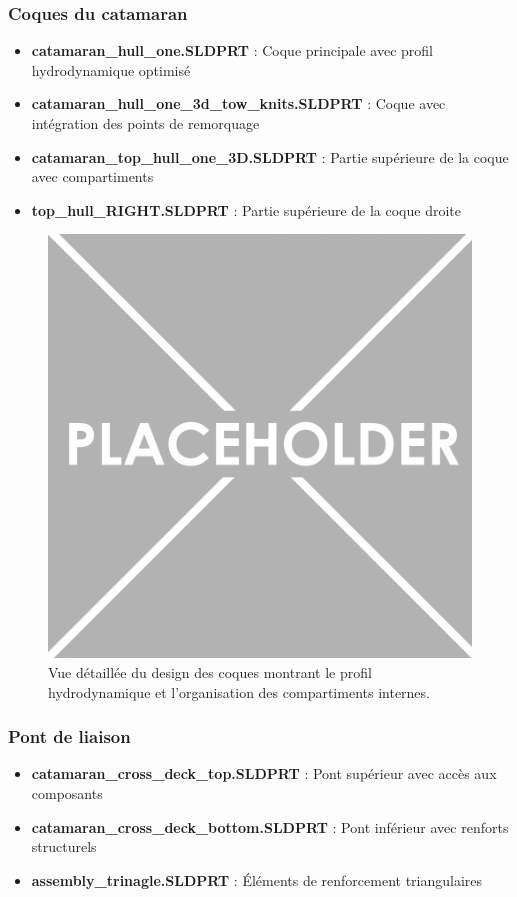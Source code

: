 {\subsubsection{Coques du catamaran}
\begin{itemize}
    \setlength{\itemsep}{.375em}
    \item \textbf{catamaran\_hull\_one.SLDPRT} : Coque principale avec profil hydrodynamique optimisé
    \item \textbf{catamaran\_hull\_one\_3d\_tow\_knits.SLDPRT} : Coque avec intégration des points de remorquage
    \item \textbf{catamaran\_top\_hull\_one\_3D.SLDPRT} : Partie supérieure de la coque avec compartiments
    \item \textbf{top\_hull\_RIGHT.SLDPRT} : Partie supérieure de la coque droite
\end{itemize}

\begin{figure}[!htpb]
    \centering
    \includegraphics[width=0.8\linewidth]{Figures/PezizaTuberosa.jpg}
    \caption[Design des coques]{Vue détaillée du design des coques montrant le profil hydrodynamique et l'organisation des compartiments internes.}
    \label{fig:hull-design}
\end{figure}

\subsubsection{Pont de liaison}
\begin{itemize}
    \setlength{\itemsep}{.375em}
    \item \textbf{catamaran\_cross\_deck\_top.SLDPRT} : Pont supérieur avec accès aux composants
    \item \textbf{catamaran\_cross\_deck\_bottom.SLDPRT} : Pont inférieur avec renforts structurels
    \item \textbf{assembly\_trinagle.SLDPRT} : Éléments de renforcement triangulaires
\end{itemize}

}
